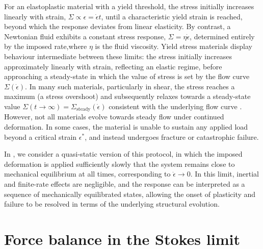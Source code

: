 For an elastoplastic material with a yield threshold, the stress initially increases linearly with strain, $\Sigma \propto \epsilon = \dot{\epsilon} t$, until a characteristic yield strain is reached, beyond which the response deviates from linear elasticity. By contrast, a Newtonian fluid exhibits a constant stress response, $\Sigma = \eta \dot{\epsilon}$, determined entirely by the imposed rate,where $\eta$ is the fluid viscosity. Yield stress materials display behaviour intermediate between these limits: the stress initially increases approximately linearly with strain, reflecting an elastic regime, before approaching a steady-state in which the value of stress is set by the flow curve $\Sigma(\dot{\epsilon})$. In many such materials, particularly in shear, the stress reaches a maximum (a stress overshoot) and subsequently relaxes towards a steady-state value $\Sigma(t \to \infty) = \Sigma_{\mathrm{steady}}(\dot{\epsilon})$ consistent with the underlying flow curve \cite{divouxShearBandingComplex2016,larson_structure_1999}. However, not all materials evolve towards steady flow under continued deformation. In some cases, the material is unable to sustain any applied load beyond a critical strain $\epsilon^*$, and instead undergoes fracture or catastrophic failure.

In , we consider a quasi-static version of this protocol, in which the imposed deformation is applied sufficiently slowly that the system remains close to mechanical equilibrium at all times, corresponding to $\dot{\epsilon} \to 0$. In this limit, inertial and finite-rate effects are negligible, and the response can be interpreted as a sequence of mechanically equilibrated states, allowing the onset of plasticity and failure to be resolved in terms of the underlying structural evolution.



\section{Force balance in the Stokes limit} \label{sec:Hydrodynamics}


